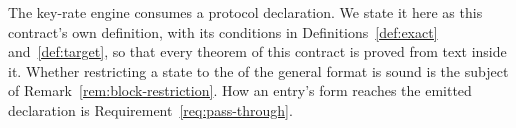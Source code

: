 
The key-rate engine consumes a protocol declaration. We state it here as this
contract's own definition, with its conditions in
Definitions~\ref{def:exact} and~\ref{def:target}, so that every theorem of
this contract is proved from text inside it. Whether restricting a state
to the  of the general format is sound is the subject of
Remark~\ref{rem:block-restriction}. How an entry's form reaches the emitted
declaration is Requirement~\ref{req:pass-through}.

